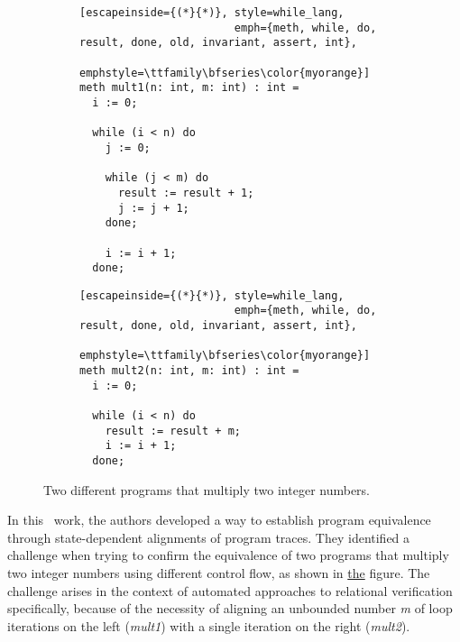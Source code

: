 \begin{figure}[h]
  \centering

  \begin{subfigure}[t]{0.49\textwidth}
    \centering
    \noindent
    \begin{lstlisting}[escapeinside={(*}{*)}, style=while_lang,
                        emph={meth, while, do, result, done, old, invariant, assert, int},
                        emphstyle=\ttfamily\bfseries\color{myorange}]
meth mult1(n: int, m: int) : int =
  i := 0;

  while (i < n) do
    j := 0;

    while (j < m) do
      result := result + 1;
      j := j + 1;
    done;

    i := i + 1;
  done;
    \end{lstlisting}
  \end{subfigure}
  \hfill
  \begin{subfigure}[t]{0.49\textwidth}
    \centering
    \noindent
    \begin{lstlisting}[escapeinside={(*}{*)}, style=while_lang,
                        emph={meth, while, do, result, done, old, invariant, assert, int},
                        emphstyle=\ttfamily\bfseries\color{myorange}]
meth mult2(n: int, m: int) : int =
  i := 0;

  while (i < n) do
    result := result + m;
    i := i + 1;
  done;
    \end{lstlisting}
  \end{subfigure}

  \caption{Two different programs that multiply two integer numbers.}
  \label{fig:mult_source_programs}
\end{figure}

In this~\cite{DBLP:conf/pldi/ChurchillP0A19} work, the authors developed a way to establish program equivalence through state-dependent alignments of program traces.
They identified a challenge when trying to confirm the equivalence of two programs that multiply two integer numbers using different control flow, as shown in \hyperref[fig:mult_source_programs]{the} figure.
The challenge arises in the context of automated approaches to relational verification specifically, because of the necessity of aligning an unbounded number \emph{m} of loop iterations on the left (\emph{mult1}) with a single iteration on the right (\emph{mult2}).

